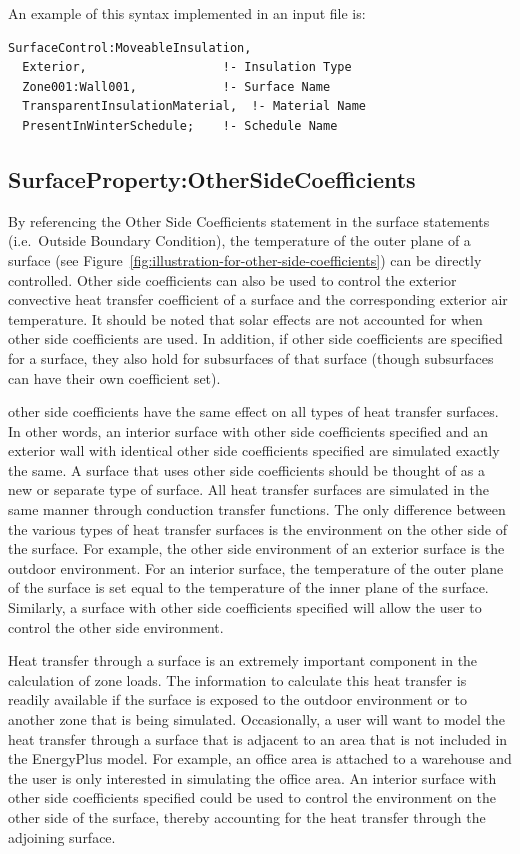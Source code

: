 An example of this syntax implemented in an input file is:

\begin{lstlisting}
SurfaceControl:MoveableInsulation,
  Exterior,                   !- Insulation Type
  Zone001:Wall001,            !- Surface Name
  TransparentInsulationMaterial,  !- Material Name
  PresentInWinterSchedule;    !- Schedule Name
\end{lstlisting}

\subsection{SurfaceProperty:OtherSideCoefficients}\label{surfacepropertyothersidecoefficients}

By referencing the Other Side Coefficients statement in the surface statements (i.e.~Outside Boundary Condition), the temperature of the outer plane of a surface (see Figure~\ref{fig:illustration-for-other-side-coefficients}) can be directly controlled. Other side coefficients can also be used to control the exterior convective heat transfer coefficient of a surface and the corresponding exterior air temperature. It should be noted that solar effects are not accounted for when other side coefficients are used. In addition, if other side coefficients are specified for a surface, they also hold for subsurfaces of that surface (though subsurfaces can have their own coefficient set).

other side coefficients have the same effect on all types of heat transfer surfaces. In other words, an interior surface with other side coefficients specified and an exterior wall with identical other side coefficients specified are simulated exactly the same. A surface that uses other side coefficients should be thought of as a new or separate type of surface. All heat transfer surfaces are simulated in the same manner through conduction transfer functions. The only difference between the various types of heat transfer surfaces is the environment on the other side of the surface. For example, the other side environment of an exterior surface is the outdoor environment. For an interior surface, the temperature of the outer plane of the surface is set equal to the temperature of the inner plane of the surface. Similarly, a surface with other side coefficients specified will allow the user to control the other side environment.

Heat transfer through a surface is an extremely important component in the calculation of zone loads. The information to calculate this heat transfer is readily available if the surface is exposed to the outdoor environment or to another zone that is being simulated. Occasionally, a user will want to model the heat transfer through a surface that is adjacent to an area that is not included in the EnergyPlus model. For example, an office area is attached to a warehouse and the user is only interested in simulating the office area. An interior surface with other side coefficients specified could be used to control the environment on the other side of the surface, thereby accounting for the heat transfer through the adjoining surface.

